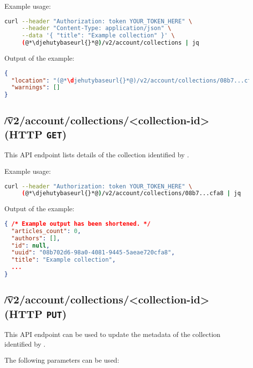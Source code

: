   Example usage:
\begin{lstlisting}[language=bash]
curl --header "Authorization: token YOUR_TOKEN_HERE" \
     --header "Content-Type: application/json" \
     --data '{ "title": "Example collection" }' \
     (@*\djehutybaseurl{}*@)/v2/account/collections | jq
\end{lstlisting}

  Output of the example:
\begin{lstlisting}[language=JSON]
{
  "location": "(@*\djehutybaseurl{}*@)/v2/account/collections/08b7...cfa8",
  "warnings": []
}
\end{lstlisting}

\subsection{\t{/v2/account/collections/<collection-id>} (HTTP \texttt{GET})}
\label{sec:v2-collections-collection-id}

  This API endpoint lists details of the collection identified by .

  Example usage:
\begin{lstlisting}[language=bash]
curl --header "Authorization: token YOUR_TOKEN_HERE" \
     (@*\djehutybaseurl{}*@)/v2/account/collections/08b7...cfa8 | jq
\end{lstlisting}

  Output of the example:
\begin{lstlisting}[language=JSON]
{ /* Example output has been shortened. */
  "articles_count": 0,
  "authors": [],
  "id": null,
  "uuid": "08b702d6-98a0-4081-9445-5aeae720cfa8",
  "title": "Example collection",
  ...
}
\end{lstlisting}

\subsection{\t{/v2/account/collections/<collection-id>} (HTTP \texttt{PUT})}

  This API endpoint can be used to update the metadata of the collection
  identified by .

  The following parameters can be used:

